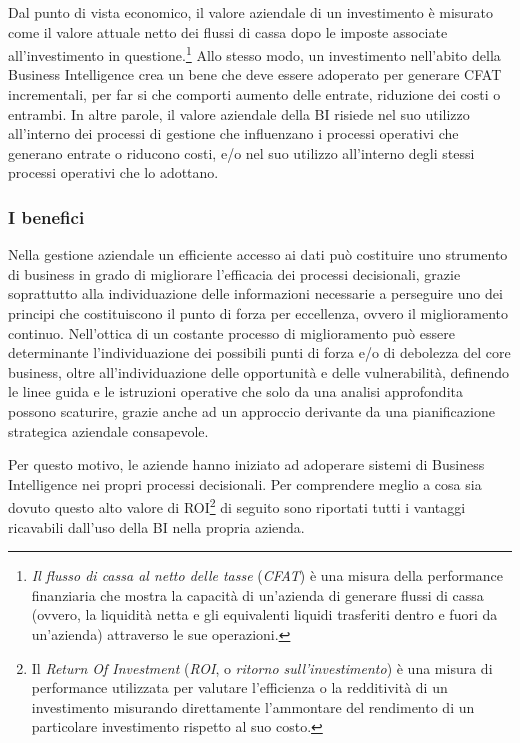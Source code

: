 Dal punto di vista economico, il valore aziendale di un investimento è misurato come il valore attuale netto dei flussi di cassa dopo le imposte associate all'investimento in questione.\footnote{\textit{Il flusso di cassa al netto delle tasse} (\textit{CFAT}) è una misura della performance finanziaria che mostra la capacità di un'azienda di generare flussi di cassa (ovvero, la liquidità netta e gli equivalenti liquidi trasferiti dentro e fuori da un'azienda) attraverso le sue operazioni.\cite{cfat_definition}}
Allo stesso modo, un investimento nell'abito della Business Intelligence crea un bene che deve essere adoperato per generare CFAT incrementali, per far si che comporti aumento delle entrate, riduzione dei costi o entrambi. In altre parole, il valore aziendale della BI risiede nel suo utilizzo all'interno dei processi di gestione che influenzano i processi operativi che generano entrate o riducono costi, e/o nel suo utilizzo all'interno degli stessi processi operativi che lo adottano.\cite{decisionpath_bi_value}


\subsubsection{I benefici}

Nella gestione aziendale un efficiente accesso ai dati può costituire uno strumento di business in grado di migliorare l'efficacia dei processi decisionali, grazie soprattutto alla individuazione delle informazioni necessarie a perseguire uno dei principi che costituiscono il punto di forza per eccellenza, ovvero il miglioramento continuo. Nell'ottica di un costante processo di miglioramento può essere determinante l'individuazione dei possibili punti di forza e/o di debolezza del core business, oltre all'individuazione delle opportunità e delle vulnerabilità, definendo le linee guida e le istruzioni operative che solo da una analisi approfondita possono scaturire, grazie anche ad un approccio derivante da una pianificazione strategica aziendale consapevole.\cite{dalla_bi_al_dw}

Per questo motivo, le aziende hanno iniziato ad adoperare sistemi di Business Intelligence nei propri processi decisionali. Per comprendere meglio a cosa sia dovuto questo alto valore di ROI\footnote{Il \textit{Return Of Investment} (\textit{ROI}, o \textit{ritorno sull'investimento}) è una misura di performance utilizzata per valutare l'efficienza o la redditività di un investimento misurando direttamente l'ammontare del rendimento di un particolare investimento rispetto al suo costo.\cite{investopedia_roi}} di seguito sono riportati tutti i vantaggi ricavabili dall'uso della BI nella propria azienda.\cite{oracle_business_intelligence}

